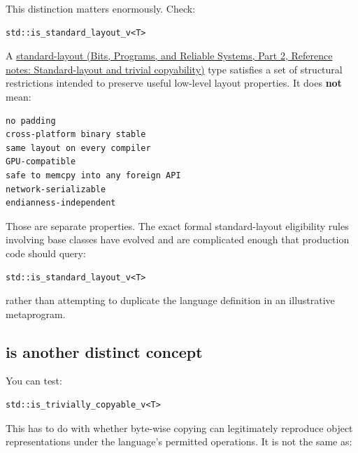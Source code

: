 \hypertarget{05-engine-i-ch003-standard-layout-does-not-mean-packed-c-struct}{}

This distinction matters enormously. Check:

\begin{verbatim}
std::is_standard_layout_v<T>
\end{verbatim}

A \href{../01-Bits-Programs-and-Reliable-Systems-P02/main.pdf\#nameddest=appendix-958870a64c53}{standard-layout (Bits, Programs, and Reliable Systems, Part 2, Reference notes: Standard-layout and trivial copyability)} type satisfies a set of structural restrictions intended to preserve useful low-level layout properties. It does \textbf{not} mean:

\begin{verbatim}
no padding
cross-platform binary stable
same layout on every compiler
GPU-compatible
safe to memcpy into any foreign API
network-serializable
endianness-independent
\end{verbatim}

Those are separate properties. The exact formal standard-layout eligibility rules involving base classes have evolved and are complicated enough that production code should query:

\begin{verbatim}
std::is_standard_layout_v<T>
\end{verbatim}

rather than attempting to duplicate the language definition in an illustrative metaprogram.

\subsection{\texorpdfstring{ is another distinct concept}{trivially\_copyable is another distinct concept}}\label{05-engine-i-ch003-trivially_copyable-is-another-distinct-concept}

\hypertarget{05-engine-i-ch003-trivially_copyable-is-another-distinct-concept}{}

You can test:

\begin{verbatim}
std::is_trivially_copyable_v<T>
\end{verbatim}

This has to do with whether byte-wise copying can legitimately reproduce object representations under the language's permitted operations. It is not the same as:

